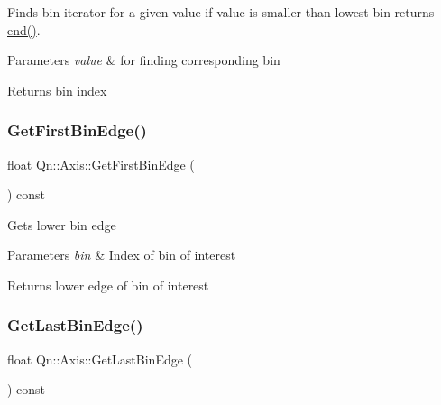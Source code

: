 Finds bin iterator for a given value if value is smaller than lowest bin returns \mbox{\hyperlink{classQn_1_1Axis_a4d2e34076f1915409a8dae58cce1812f}{end()}}. 
\begin{DoxyParams}{Parameters}
{\em value} & for finding corresponding bin \\
\hline
\end{DoxyParams}
\begin{DoxyReturn}{Returns}
bin index 
\end{DoxyReturn}
\mbox{\label{classQn_1_1Axis_ae9c911292458f9668e689be50614d8dc}} 
\subsubsection{\texorpdfstring{Get\+First\+Bin\+Edge()}{GetFirstBinEdge()}}
{\footnotesize\ttfamily float Qn\+::\+Axis\+::\+Get\+First\+Bin\+Edge (\begin{DoxyParamCaption}{ }\end{DoxyParamCaption}) const\hspace{0.3cm}{\ttfamily [inline]}}

Gets lower bin edge 
\begin{DoxyParams}{Parameters}
{\em bin} & Index of bin of interest \\
\hline
\end{DoxyParams}
\begin{DoxyReturn}{Returns}
lower edge of bin of interest 
\end{DoxyReturn}
\mbox{\label{classQn_1_1Axis_ac363f1585fc08372b81ebba24f2cd38f}} 
\subsubsection{\texorpdfstring{Get\+Last\+Bin\+Edge()}{GetLastBinEdge()}}
{\footnotesize\ttfamily float Qn\+::\+Axis\+::\+Get\+Last\+Bin\+Edge (\begin{DoxyParamCaption}{ }\end{DoxyParamCaption}) const\hspace{0.3cm}{\ttfamily [inline]}}

